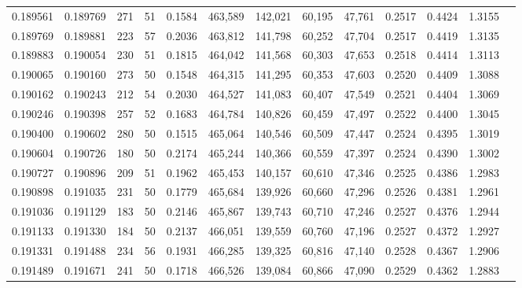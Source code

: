 \begin{tabular}{rrrrrrrrrrrrr}
0.189561 & 0.189769 &   271 &  51 &                                     0.1584 & 463,589 & 142,021 &  60,195 &  47,761 & 0.2517 & 0.4424 & 1.3155 \\
0.189769 & 0.189881 &   223 &  57 &                                     0.2036 & 463,812 & 141,798 &  60,252 &  47,704 & 0.2517 & 0.4419 & 1.3135 \\
0.189883 & 0.190054 &   230 &  51 &                                     0.1815 & 464,042 & 141,568 &  60,303 &  47,653 & 0.2518 & 0.4414 & 1.3113 \\
0.190065 & 0.190160 &   273 &  50 &                                     0.1548 & 464,315 & 141,295 &  60,353 &  47,603 & 0.2520 & 0.4409 & 1.3088 \\
0.190162 & 0.190243 &   212 &  54 &                                     0.2030 & 464,527 & 141,083 &  60,407 &  47,549 & 0.2521 & 0.4404 & 1.3069 \\
0.190246 & 0.190398 &   257 &  52 &                                     0.1683 & 464,784 & 140,826 &  60,459 &  47,497 & 0.2522 & 0.4400 & 1.3045 \\
0.190400 & 0.190602 &   280 &  50 &                                     0.1515 & 465,064 & 140,546 &  60,509 &  47,447 & 0.2524 & 0.4395 & 1.3019 \\
0.190604 & 0.190726 &   180 &  50 &                                     0.2174 & 465,244 & 140,366 &  60,559 &  47,397 & 0.2524 & 0.4390 & 1.3002 \\
0.190727 & 0.190896 &   209 &  51 &                                     0.1962 & 465,453 & 140,157 &  60,610 &  47,346 & 0.2525 & 0.4386 & 1.2983 \\
0.190898 & 0.191035 &   231 &  50 &                                     0.1779 & 465,684 & 139,926 &  60,660 &  47,296 & 0.2526 & 0.4381 & 1.2961 \\
0.191036 & 0.191129 &   183 &  50 &                                     0.2146 & 465,867 & 139,743 &  60,710 &  47,246 & 0.2527 & 0.4376 & 1.2944 \\
0.191133 & 0.191330 &   184 &  50 &                                     0.2137 & 466,051 & 139,559 &  60,760 &  47,196 & 0.2527 & 0.4372 & 1.2927 \\
0.191331 & 0.191488 &   234 &  56 &                                     0.1931 & 466,285 & 139,325 &  60,816 &  47,140 & 0.2528 & 0.4367 & 1.2906 \\
0.191489 & 0.191671 &   241 &  50 &                                     0.1718 & 466,526 & 139,084 &  60,866 &  47,090 & 0.2529 & 0.4362 & 1.2883 \\

\end{tabular}

